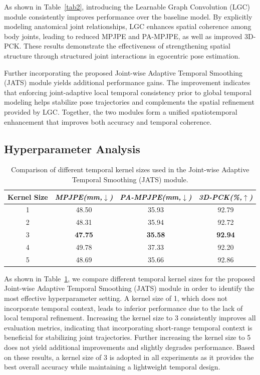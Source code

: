 \documentclass[conference]{IEEEtran}
\begin{document}
As shown in Table~\ref{tab2}, introducing the Learnable Graph Convolution (LGC) module consistently improves performance over the baseline model. By explicitly modeling anatomical joint relationships, LGC enhances spatial coherence among body joints, leading to reduced MPJPE and PA-MPJPE, as well as improved 3D-PCK. These results demonstrate the effectiveness of strengthening spatial structure through structured joint interactions in egocentric pose estimation.

Further incorporating the proposed Joint-wise Adaptive Temporal Smoothing (JATS) module yields additional performance gains. The improvement indicates that enforcing joint-adaptive local temporal consistency prior to global temporal modeling helps stabilize pose trajectories and complements the spatial refinement provided by LGC. Together, the two modules form a unified spatiotemporal enhancement that improves both accuracy and temporal coherence.


\subsection{Hyperparameter Analysis}

\begin{table}[htbp]
\caption{Comparison of different temporal kernel sizes used in the Joint-wise Adaptive Temporal Smoothing (JATS) module.}
\begin{center}
\begin{tabular}{c c c c}
\hline
{Kernel Size}& {\textit{MPJPE(mm,$\downarrow$)}}& {\textit{PA-MPJPE(mm,$\downarrow$)}}& {\textit{3D-PCK(\%,$\uparrow$)}}\\
\hline
{1} & {48.50} & {35.93} & {92.79} \\
{2} & {48.31} & {35.94} & {92.72} \\
{3} & \textbf{47.75} & \textbf{35.58} & \textbf{92.94} \\
{4} & {49.78} & {37.33} & {92.20} \\
{5} & {48.69} & {35.66} & {92.86} \\
\hline
\end{tabular}
\label{tab_hyper}
\end{center}
\end{table}

As shown in Table~\ref{tab_hyper}, we compare different temporal kernel sizes for the proposed Joint-wise Adaptive Temporal Smoothing (JATS) module in order to identify the most effective hyperparameter setting. A kernel size of 1, which does not incorporate temporal context, leads to inferior performance due to the lack of local temporal refinement. Increasing the kernel size to 3 consistently improves all evaluation metrics, indicating that incorporating short-range temporal context is beneficial for stabilizing joint trajectories. Further increasing the kernel size to 5 does not yield additional improvements and slightly degrades performance. Based on these results, a kernel size of 3 is adopted in all experiments as it provides the best overall accuracy while maintaining a lightweight temporal design.
\end{document}
